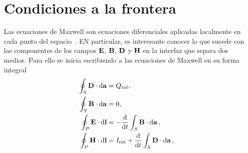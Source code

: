 \section{Condiciones a la frontera}
Las ecuaciones de Maxwell son ecuaciones diferenciales aplicadas localmente en cada punto del espacio~\cite{Jackson}. EN particular, es interesante conocer lo que sucede con las componentes de los campos $\vb{E}$, $\vb{B}$, $\vb{D}$ y $\vb{H}$ en la interfaz que separa dos medios. Para ello se inicia escribiendo a las ecuaciones de Maxwell en su forma integral~\cite{Griffiths}
\begin{subequations}
	\begin{align}
		\oint_{S}\vb{D}\cdot\dd{\vb{a}}&=Q_{tot},\label{MaxwellInt1}\\
		\oint_{S}\vb{B}\cdot\dd{\vb{a}}&=0,\label{MaxwellInt2}\\
		\oint_{P}\vb{E}\cdot\dd{\vb{l}} &=- \dv{}{t}\int_{S}\vb{B}\cdot\dd{\vb{a}},\label{MaxwellInt3}\\
		\oint_{P}\vb{H}\cdot\dd{\vb{l}}&=I_{tot}+\dv{}{t}\int_{S}\vb{D}\cdot\dd{\vb{a}}\label{eq:MaxwellInt4},
	\end{align}
\end{subequations}

